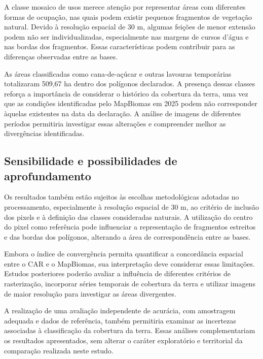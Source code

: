 A classe mosaico de usos merece atenção por representar áreas com diferentes formas de ocupação, nas quais podem existir pequenos fragmentos de vegetação natural. Devido à resolução espacial de 30 m, algumas feições de menor extensão podem não ser individualizadas, especialmente nas margens de cursos d'água e nas bordas dos fragmentos. Essas características podem contribuir para as diferenças observadas entre as bases.

As áreas classificadas como cana-de-açúcar e outras lavouras temporárias totalizaram 509,67 ha dentro dos polígonos declarados. A presença dessas classes reforça a importância de considerar o histórico da cobertura da terra, uma vez que as condições identificadas pelo MapBiomas em 2025 podem não corresponder àquelas existentes na data da declaração. A análise de imagens de diferentes períodos permitiria investigar essas alterações e compreender melhor as divergências identificadas.


\subsection{Sensibilidade e possibilidades de aprofundamento}

Os resultados também estão sujeitos às escolhas metodológicas adotadas no processamento, especialmente à resolução espacial de 30 m, ao critério de inclusão dos pixels e à definição das classes consideradas naturais. A utilização do centro do pixel como referência pode influenciar a representação de fragmentos estreitos e das bordas dos polígonos, alterando a área de correspondência entre as bases.

Embora o índice de convergência permita quantificar a concordância espacial entre o CAR e o MapBiomas, sua interpretação deve considerar essas limitações. Estudos posteriores poderão avaliar a influência de diferentes critérios de rasterização, incorporar séries temporais de cobertura da terra e utilizar imagens de maior resolução para investigar as áreas divergentes.

A realização de uma avaliação independente de acurácia, com amostragem adequada e dados de referência, também permitiria examinar as incertezas associadas à classificação da cobertura da terra. Essas análises complementariam os resultados apresentados, sem alterar o caráter exploratório e territorial da comparação realizada neste estudo.
